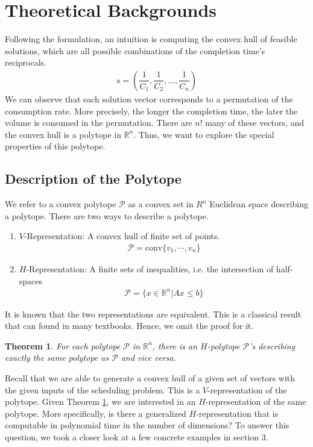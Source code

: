 \documentclass[12pt,letterpaper]{article}
\newcommand*{\R}{\mathbb{R}}
\newcommand{\Poly}{\mathcal{P}}
\newtheorem{theorem}{Theorem}[section]
\begin{document}
\section{Theoretical Backgrounds}
Following the formulation, an intuition is computing the convex hull of feasible solutions, 
which are all possible combinations of the completion time's reciprocals. 
\begin{align*}
 s = \left( \dfrac{1}{C_1}, \dfrac{1}{C_2}, ..., \dfrac{1}{C_n}\right)
\end{align*} 
We can observe that each solution vector corresponds to a permutation of the consumption rate. 
More precisely, the longer the completion time, the later the volume is consumed in the permutation.
There are $n!$ many of these vectors, and the convex hull is a polytope in $\R^n$. 
Thus, we want to explore the special properties of this polytope.

\subsection{Description of the Polytope}
We refer to a convex polytope $\Poly$ as a convex set in $R^n$ Euclidean space describing a polytope. 
There are two ways to describe a polytope.
\begin{enumerate}
    \item $V$-Representation: A convex hull of finite set of points. 
    \begin{align*}
        \Poly = \text{conv}\{v_1, \cdots, v_n \}
    \end{align*}
    \item $H$-Representation: A finite sets of inequalities, i.e. the intersection of half-spaces
    \begin{align*}
        \Poly = \{x \in \R^n | Ax \leq b \}
    \end{align*}
\end{enumerate}
It is known that the two representations are equivalent. 
This is a classical result that can found in many textbooks. 
Hence, we omit the proof for it. 
\begin{theorem}
    \label{thm:polytope}
    For each polytope $\Poly$ in $\R^n$, there is an $H$-polytope $\Poly$'s 
    describing exactly the same polytope as $\Poly$ and vice versa.
\end{theorem}
Recall that we are able to generate a convex hull of a given set of vectors with 
the given inputs of the scheduling problem. This is a $V$-representation of the polytope.
Given Theorem \ref{thm:polytope}, we are interested in an $H$-representation of the same polytope.
More specifically, is there a generalized $H$-representation that is computable in polynomial time 
in the number of dimensions? 
To answer this question, we took a closer look at 
a few concrete examples in section 3.
\end{document}
